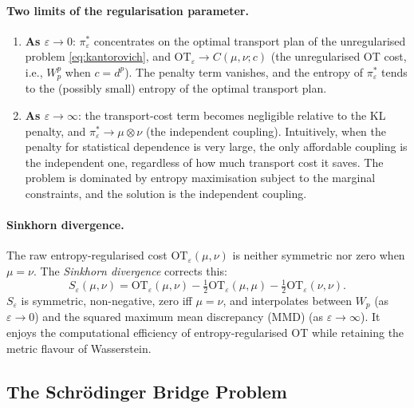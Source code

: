 \documentclass[12pt]{article}
\begin{document}
\paragraph{Two limits of the regularisation parameter.}
\begin{enumerate}
  \item \textbf{As $\varepsilon \to 0$}: $\pi_\varepsilon^*$
    concentrates on the optimal transport plan of the
    unregularised problem \eqref{eq:kantorovich}, and
    $\mathrm{OT}_\varepsilon \to C(\mu,\nu;c)$ (the unregularised
    OT cost, i.e., $W_p^p$ when $c = d^p$).  The penalty term
    vanishes, and the entropy of $\pi_\varepsilon^*$ tends to
    the (possibly small) entropy of the optimal transport plan.
  \item \textbf{As $\varepsilon \to \infty$}: the transport-cost
    term becomes negligible relative to the KL penalty, and
    $\pi_\varepsilon^* \to \mu\otimes\nu$ (the independent
    coupling).  Intuitively, when the penalty for statistical
    dependence is very large, the only affordable coupling is the
    independent one, regardless of how much transport cost it saves.
    The problem is dominated by entropy maximisation subject to the
    marginal constraints, and the solution is the independent coupling.
\end{enumerate}

\paragraph{Sinkhorn divergence.}
The raw entropy-regularised cost $\mathrm{OT}_\varepsilon(\mu,\nu)$
is neither symmetric nor zero when $\mu = \nu$.  The
\emph{Sinkhorn divergence} \citep{GenevayEtal2018} corrects this:
\begin{equation}\label{eq:sinkhorn_div}
  S_\varepsilon(\mu,\nu)
  = \mathrm{OT}_\varepsilon(\mu,\nu)
  - \tfrac{1}{2}\mathrm{OT}_\varepsilon(\mu,\mu)
  - \tfrac{1}{2}\mathrm{OT}_\varepsilon(\nu,\nu).
\end{equation}
$S_\varepsilon$ is symmetric, non-negative, zero iff $\mu = \nu$,
and interpolates between $W_p$ (as $\varepsilon \to 0$) and the
squared maximum mean discrepancy (MMD) (as $\varepsilon \to \infty$).
It enjoys the computational efficiency of entropy-regularised OT
while retaining the metric flavour of Wasserstein.

\subsection{The Schr\"odinger Bridge Problem}
\label{sec:schrod}
\end{document}
